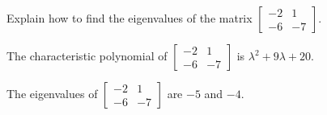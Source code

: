 
\begin{exerciseStatement}


Explain how to find the eigenvalues of the matrix \( \left[\begin{array}{cc}
-2 & 1 \\
-6 & -7
\end{array}\right] \).


\end{exerciseStatement}
    
\begin{exerciseAnswer} 


The characteristic polynomial of \( \left[\begin{array}{cc}
-2 & 1 \\
-6 & -7
\end{array}\right] \) is \( \lambda^{2} + 9 \lambda + 20 \).



The eigenvalues of \( \left[\begin{array}{cc}
-2 & 1 \\
-6 & -7
\end{array}\right] \) are \( -5 \) and \( -4 \).


\end{exerciseAnswer}
    
